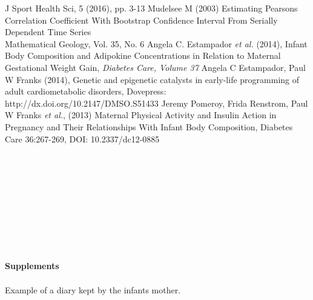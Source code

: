 \documentclass{article}
\begin{document}
\begin{thebibliography}{99}
J Sport Health Sci, 5 (2016), pp. 3-13
Mudelsee M (2003) Estimating Pearsons Correlation Coefficient With Bootstrap Confidence Interval From Serially
Dependent Time Series\\
Mathematical Geology, Vol. 35, No. 6
Angela C. Estampador \textit{et al.} (2014), Infant Body Composition and Adipokine Concentrations in Relation to Maternal Gestational Weight Gain,
\newblock \textit{Diabetes Care, Volume 37}
Angela C Estampador, Paul W Franks (2014), Genetic and epigenetic catalysts in early-life programming of adult cardiometabolic disorders, Dovepress: \\http://dx.doi.org/10.2147/DMSO.S51433
Jeremy Pomeroy, Frida Renstrom, Paul W Franks \textit{et al.}, (2013) Maternal Physical Activity and Insulin Action in Pregnancy and Their Relationships With Infant Body Composition, Diabetes Care 36:267-269, DOI: 10.2337/dc12-0885
\end{thebibliography}
\\
\\
\\
\\
\\
\\
\\
\\
\\
\Large{\textbf{Supplements}}
\\
\\
\normalsize Example of a diary kept by the infants mother.

\end{document}
